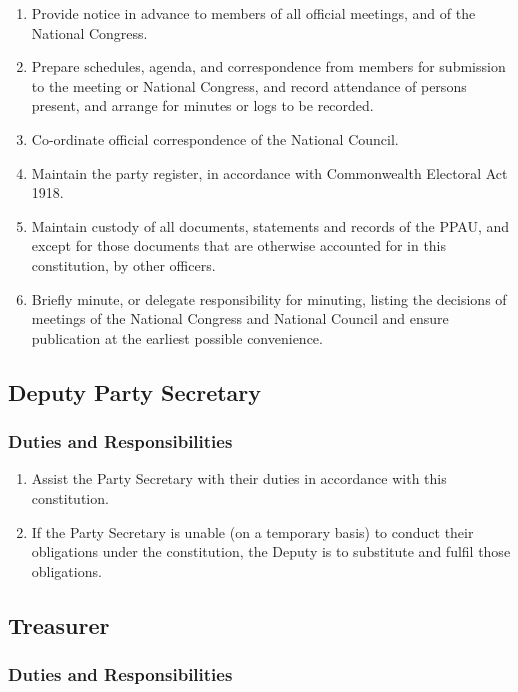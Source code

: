 \documentclass[a4paper,titlepage,8.5pt]{article}
\begin{document}
\begin{enumerate}
\item Provide notice in advance to members of all official meetings, and of the National Congress.
\item Prepare schedules, agenda, and correspondence from members for submission to the meeting or National Congress, and record attendance of persons present, and arrange for minutes or logs to be recorded.
\item Co-ordinate official correspondence of the National Council.
\item Maintain the party register, in accordance with Commonwealth Electoral Act 1918.
\item Maintain custody of all documents, statements and records of the PPAU, and except for those documents that are otherwise accounted for in this constitution, by other officers.
\item Briefly minute, or delegate responsibility for minuting, listing the decisions of meetings of the National Congress and National Council and ensure publication at the earliest possible convenience.
\end{enumerate}

\subsection{Deputy Party Secretary}

\subsubsection{Duties and Responsibilities}

\begin{enumerate}
\item Assist the Party Secretary with their duties in accordance with this constitution.
\item If the Party Secretary is unable (on a temporary basis) to conduct their obligations under the constitution, the Deputy is to substitute and fulfil those obligations.
\end{enumerate}

\subsection{Treasurer}

\subsubsection{Duties and Responsibilities}
\end{document}
